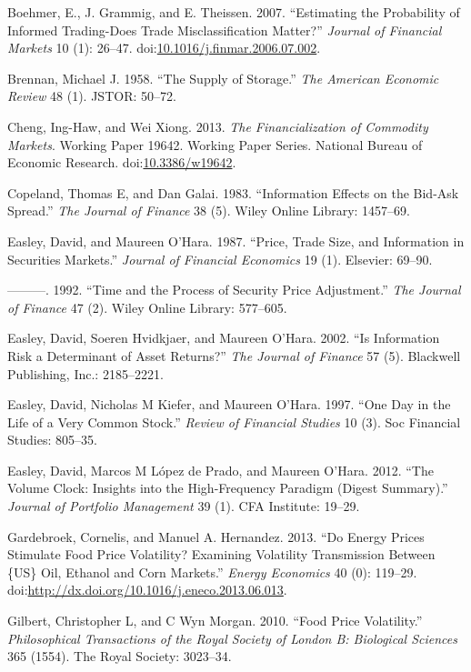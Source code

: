 \documentclass[]{elsarticle} %
\begin{document}
Boehmer, E., J. Grammig, and E. Theissen. 2007. ``Estimating the
Probability of Informed Trading-Does Trade Misclassification Matter?''
\emph{Journal of Financial Markets} 10 (1): 26--47.
doi:\href{http://dx.doi.org/10.1016/j.finmar.2006.07.002}{10.1016/j.finmar.2006.07.002}.

Brennan, Michael J. 1958. ``The Supply of Storage.'' \emph{The American
Economic Review} 48 (1). JSTOR: 50--72.

Cheng, Ing-Haw, and Wei Xiong. 2013. \emph{The Financialization of
Commodity Markets}. Working Paper 19642. Working Paper Series. National
Bureau of Economic Research.
doi:\href{http://dx.doi.org/10.3386/w19642}{10.3386/w19642}.

Copeland, Thomas E, and Dan Galai. 1983. ``Information Effects on the
Bid-Ask Spread.'' \emph{The Journal of Finance} 38 (5). Wiley Online
Library: 1457--69.

Easley, David, and Maureen O'Hara. 1987. ``Price, Trade Size, and
Information in Securities Markets.'' \emph{Journal of Financial
Economics} 19 (1). Elsevier: 69--90.

---------. 1992. ``Time and the Process of Security Price Adjustment.''
\emph{The Journal of Finance} 47 (2). Wiley Online Library: 577--605.

Easley, David, Soeren Hvidkjaer, and Maureen O'Hara. 2002. ``Is
Information Risk a Determinant of Asset Returns?'' \emph{The Journal of
Finance} 57 (5). Blackwell Publishing, Inc.: 2185--2221.

Easley, David, Nicholas M Kiefer, and Maureen O'Hara. 1997. ``One Day in
the Life of a Very Common Stock.'' \emph{Review of Financial Studies} 10
(3). Soc Financial Studies: 805--35.

Easley, David, Marcos M L{ó}pez de Prado, and Maureen O'Hara. 2012.
``The Volume Clock: Insights into the High-Frequency Paradigm (Digest
Summary).'' \emph{Journal of Portfolio Management} 39 (1). CFA
Institute: 19--29.

Gardebroek, Cornelis, and Manuel A. Hernandez. 2013. ``Do Energy Prices
Stimulate Food Price Volatility? Examining Volatility Transmission
Between \{US\} Oil, Ethanol and Corn Markets.'' \emph{Energy Economics}
40 (0): 119--29.
doi:\href{http://dx.doi.org/http://dx.doi.org/10.1016/j.eneco.2013.06.013}{http://dx.doi.org/10.1016/j.eneco.2013.06.013}.

Gilbert, Christopher L, and C Wyn Morgan. 2010. ``Food Price
Volatility.'' \emph{Philosophical Transactions of the Royal Society of
London B: Biological Sciences} 365 (1554). The Royal Society: 3023--34.
\end{document}
